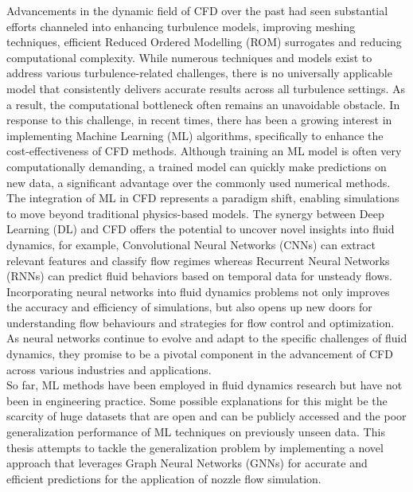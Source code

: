 Advancements in the dynamic field of CFD over the past had seen substantial efforts channeled into enhancing turbulence models, improving meshing techniques, efficient Reduced Ordered Modelling (ROM) surrogates and reducing computational complexity. While numerous techniques and models exist to address various turbulence-related challenges, there is no universally applicable model that consistently delivers accurate results across all turbulence settings. As a result, the computational bottleneck often remains an unavoidable obstacle. In response to this challenge, in recent times, there has been a growing interest in implementing Machine Learning (ML) algorithms, specifically to enhance the cost-effectiveness of CFD methods. Although training an ML model is often very computationally demanding, a trained model can quickly make predictions on new data, a significant advantage over the commonly used numerical methods. The integration of ML in CFD represents a paradigm shift, enabling simulations to move beyond traditional physics-based models. The synergy between Deep Learning (DL) and CFD offers the potential to uncover novel insights into fluid dynamics, for example, Convolutional Neural Networks (CNNs) can extract relevant features and classify flow regimes whereas Recurrent Neural Networks (RNNs) can predict fluid behaviors based on temporal data for unsteady flows. Incorporating neural networks into fluid dynamics problems not only improves the accuracy and efficiency of simulations, but also opens up new doors for understanding flow behaviours and strategies for flow control and optimization. As neural networks continue to evolve and adapt to the specific challenges of fluid dynamics, they promise to be a pivotal component in the advancement of CFD across various industries and applications. \\
So far, ML methods have been employed in fluid dynamics research but have not been in engineering practice. Some possible explanations for this might be the scarcity of huge datasets that are open and can be publicly accessed and the poor generalization performance of ML techniques on previously unseen data. This thesis attempts to tackle the generalization problem by implementing a novel approach that leverages Graph Neural Networks (GNNs) for accurate and efficient predictions for the application of nozzle flow simulation. 
